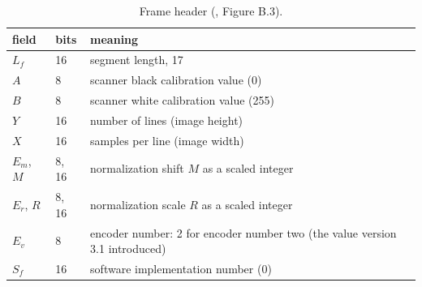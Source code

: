 \begin{table}[ht]
  \centering\small
  \begin{tabular}{@{}llp{9.3cm}@{}}
    \toprule
    field & bits & meaning \\
    \midrule
    $L_f$ & 16 & segment length, 17 \\
    $A$ & 8 & scanner black calibration value (0) \\
    $B$ & 8 & scanner white calibration value (255) \\
    $Y$ & 16 & number of lines (image height) \\
    $X$ & 16 & samples per line (image width) \\
    $E_m$, $M$ & 8, 16 & normalization shift $M$ as a scaled integer \\
    $E_r$, $R$ & 8, 16 & normalization scale $R$ as a scaled integer \\
    $E_v$ & 8 & encoder number: 2 for encoder number two (the value version 3.1 introduced) \\
    $S_f$ & 16 & software implementation number (0) \\
    \bottomrule
  \end{tabular}
  \caption{Frame header (, Figure B.3).}
  \label{tab:sof}
\end{table}

